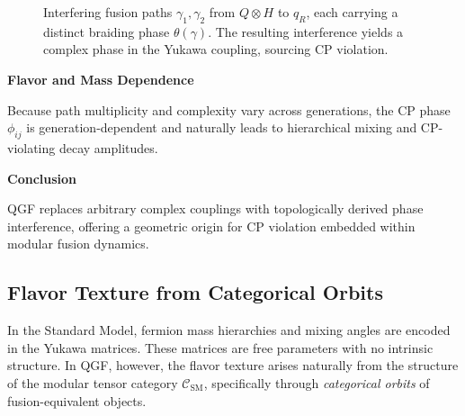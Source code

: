 \documentclass[11pt]{article}
\begin{document}
\begin{figure}[H]
\centering
{}
\caption{Interfering fusion paths \( \gamma_1, \gamma_2 \) from \( Q \otimes H \) to \( q_R \), each carrying a distinct braiding phase \( \theta(\gamma) \). The resulting interference yields a complex phase in the Yukawa coupling, sourcing CP violation.}
\label{fig:cp-interference}
\end{figure}

\vspace{0.5em}
\noindent\textbf{Flavor and Mass Dependence}

Because path multiplicity and complexity vary across generations, the CP phase \( \phi_{ij} \) is generation-dependent and naturally leads to hierarchical mixing and CP-violating decay amplitudes.

\vspace{0.5em}
\noindent\textbf{Conclusion}

QGF replaces arbitrary complex couplings with topologically derived phase interference, offering a geometric origin for CP violation embedded within modular fusion dynamics.



\subsection{Flavor Texture from Categorical Orbits}

In the Standard Model, fermion mass hierarchies and mixing angles are encoded in the Yukawa matrices. These matrices are free parameters with no intrinsic structure. In QGF, however, the flavor texture arises naturally from the structure of the modular tensor category \( \mathcal{C}_{\text{SM}} \), specifically through \textit{categorical orbits} of fusion-equivalent objects.
\end{document}
